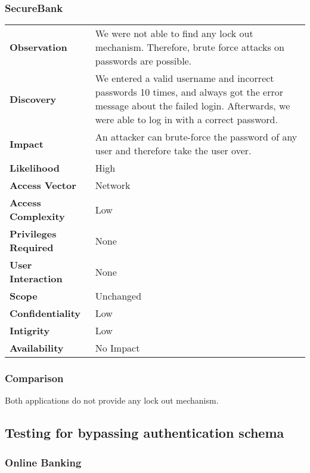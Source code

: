 \subsubsection*{SecureBank}

\begin{tabular}{l|p{10cm}}

\textbf{Observation} & We were not able to find any lock out mechanism. Therefore, brute force attacks on passwords are possible. \\
\textbf{Discovery} & We entered a valid username and incorrect passwords 10 times, and always got the error message about the failed login. Afterwards, we were able to log in with a correct password. \\
\textbf{Impact} & An attacker can brute-force the password of any user and therefore take the user over. \\
\textbf{Likelihood} & High \\
\textbf{Access Vector} & Network \\
\textbf{Access Complexity} & Low \\
\textbf{Privileges Required} & None \\
\textbf{User Interaction} & None \\
\textbf{Scope} & Unchanged \\
\textbf{Confidentiality} & Low \\
\textbf{Intigrity} & Low \\
\textbf{Availability} & No Impact \\
\end{tabular}

\subsubsection*{Comparison}
Both applications do not provide any lock out mechanism.

\clearpage




\subsection{Testing for bypassing authentication schema}

\subsubsection*{Online Banking}

